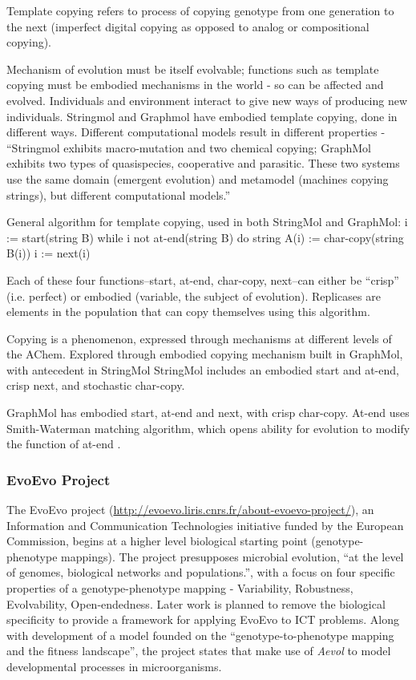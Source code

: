 Template copying refers to process of copying genotype from one generation to the next (imperfect digital copying as opposed to analog or compositional copying).

Mechanism of evolution must be itself evolvable; functions such as template copying must be embodied mechanisms in the world - so can be affected and evolved.
Individuals and environment interact to give new ways of producing new individuals.
Stringmol and Graphmol have embodied template copying, done in different ways. Different computational models result in different properties - ``Stringmol exhibits macro-mutation and two chemical copying; GraphMol exhibits two types of quasispecies, cooperative and parasitic. These two systems use the same domain (emergent evolution) and metamodel (machines copying strings), but different computational models.''

General algorithm for template copying, used in both StringMol and GraphMol: \cite{Nellis2014}
i := start(string B)
while i not at-end(string B) do
string A(i) := char-copy(string B(i))
i := next(i)

Each of these four functions--start, at-end, char-copy, next--can either be ``crisp'' (i.e. perfect) or embodied (variable, the subject of evolution). Replicases are elements in the population that can copy themselves using this algorithm.

Copying is a phenomenon, expressed through mechanisms at different levels of the AChem. Explored through embodied copying mechanism built in GraphMol, with antecedent in StringMol \parencite{Hickinbotham2011}
StringMol includes an embodied start and at-end, crisp next, and stochastic char-copy. 

GraphMol has embodied start, at-end and next, with crisp char-copy. At-end uses Smith-Waterman matching algorithm, which opens ability for evolution to modify the function of at-end \parencite[p.143]{Nellis2012}. 

\subsubsection{EvoEvo Project}
The EvoEvo project (\url{http://evoevo.liris.cnrs.fr/about-evoevo-project/}), an Information and Communication Technologies initiative funded by the European Commission, begins at a higher level biological starting point (genotype-phenotype mappings). The project presupposes microbial evolution, ``at the level of genomes, biological networks and populations.'', with a focus on four specific properties of a genotype-phenotype mapping - Variability, Robustness, Evolvability, Open-endedness. Later work is planned to remove the biological specificity to provide a framework for applying EvoEvo to ICT problems. Along with development of a model founded on the ``genotype-to-phenotype mapping and the fitness landscape'', the project states that make use of \emph{Aevol} \parencite{Knibbe:2006vn,Knibbe:2007kx} to model developmental processes in microorganisms.

